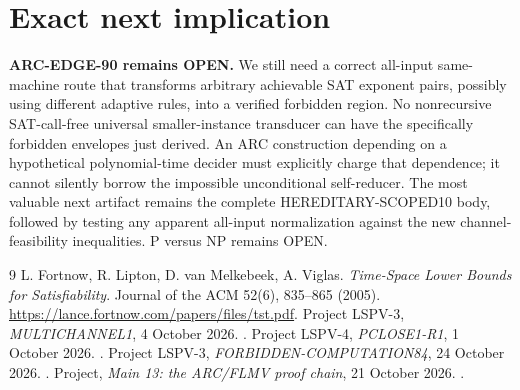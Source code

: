 \documentclass[11pt]{article}
\begin{document}
\section{Exact next implication}
\noindent\textbf{ARC-EDGE-90 remains OPEN.} We still need a correct all-input same-machine route that transforms arbitrary achievable SAT exponent pairs, possibly using different adaptive rules, into a verified forbidden region. No nonrecursive SAT-call-free universal smaller-instance transducer can have the specifically forbidden envelopes just derived. An ARC construction depending on a hypothetical polynomial-time decider must explicitly charge that dependence; it cannot silently borrow the impossible unconditional self-reducer. The most valuable next artifact remains the complete HEREDITARY-SCOPED10 body, followed by testing any apparent all-input normalization against the new channel-feasibility inequalities. P versus NP remains OPEN.

\begin{thebibliography}{9}
 L. Fortnow, R. Lipton, D. van Melkebeek, A. Viglas. \emph{Time-Space Lower Bounds for Satisfiability}. Journal of the ACM 52(6), 835--865 (2005). \url{https://lance.fortnow.com/papers/files/tst.pdf}.
 Project LSPV-3, \emph{MULTICHANNEL1}, 4 October 2026. .
 Project LSPV-4, \emph{PCLOSE1-R1}, 1 October 2026. .
 Project LSPV-3, \emph{FORBIDDEN-COMPUTATION84}, 24 October 2026. .
 Project, \emph{Main 13: the ARC/FLMV proof chain}, 21 October 2026. .
\end{thebibliography}
\end{document}
